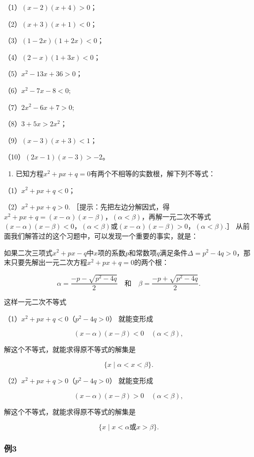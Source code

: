 （1）\((x - 2)(x + 4) > 0\)；

（2）\((x + 3)(x + 1) < 0\)；

（3）\((1 - 2x)(1 + 2x) < 0\)；

（4）\((2 - x)(1 + 3x) < 0\)；

（5）\(x^{2} - 13x + 36 > 0\)；

（6）\(x^{2} - 7x - 8 < 0;\)

（7）\(2x^{2} - 6x + 7 > 0;\)

（8）\(3 + 5x > 2x^{2}\)；

（9）\((x - 3)(x + 3) < 1\)；

（10）\((2x - 1)(x - 3) > -2\)。

\begin{enumerate}[start=2]
\item
  已知方程\(x^{2} + px + q = 0\)有两个不相等的实数根，解下列不等式：
\end{enumerate}

（1）\(x^{2} + px + q < 0\)；

（2）\(x^{2} + px + q > 0.\)
［提示：先把左边分解因式，得\(x^{2}+px+q=(x-\alpha)(x-\beta)\)，\((\alpha<\beta)\)，再解一元二次不等式\((x-\alpha)(x-\beta)<0\)，\((\alpha<\beta)\)或\((x-\alpha)(x-\beta)>0\)，\((\alpha<\beta)\).］
从前面我们解答过的这个习题中，可以发现一个重要的事实，就是：

如果二次三项式\(x^{2} + px - q\)中\(x\)项的系数\(p\)和常数项\(q\)满足条件\(\Delta = p^2 - 4q > 0\)，那末只要先解出一元二次方程\(x^{2} + px + q = 0\)的两个根：

\[
\alpha = \frac{- p - \sqrt{p^{2} - 4 q}}{2} \quad \text{和} \quad \beta = \frac{- p + \sqrt{p^{2} - 4 q}}{2}.
\]

这样一元二次不等式

（1）\(x^{2} + px + q < 0\)（\(p^{2} - 4q > 0\)） 就能变形成

\[
(x - \alpha) (x - \beta) < 0 \quad (\alpha < \beta),
\]

解这个不等式，就能求得原不等式的解集是

\[
\{x \mid \alpha < x < \beta \}.
\]

（2）\(x^{2}+px+q>0\)（\(p^{2} - 4q > 0\)） 就能变形成

\[
(x - \alpha) (x - \beta) > 0 \quad (\alpha < \beta),
\]

解这个不等式，就能求得原不等式的解集是

\[
\{x\mid x<\alpha\text{或}x>\beta\}.
\]

\subsubsection{例3}

